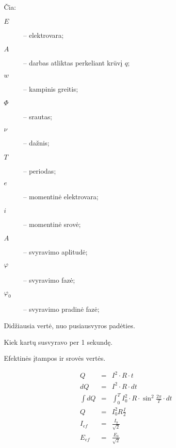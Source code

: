 Čia:
\begin{description}
  \item[$E$] – elektrovara;
  \item[$A$] – darbas atliktas perkeliant krūvį $q$;
  \item[$w$] – kampinis greitis;
  \item[$\Phi$] – srautas; %
  \item[$\nu$] – dažnis;
  \item[$T$] – periodas;
  \item[$e$] – momentinė elektrovara;
  \item[$i$] – momentinė srovė;
  \item[$A$] – svyravimo aplitudė;
  \item[$\varphi$] – svyravimo fazė;
  \item[$\varphi_{0}$] – svyravimo pradinė fazė;
\end{description}

\begin{defn}[Aplitudė]
  Didžiausia vertė, nuo pusiausvyros padėties.
\end{defn}

\begin{defn}
  Kiek kartų susvyravo per 1 sekundę.
\end{defn}

Efektinės įtampos ir srovės vertės.

\begin{align*}
  Q &=& I^{2} \cdot R \cdot t \\
  dQ &=& I^{2} \cdot R \cdot dt \\
  \int dQ &=&
    \int _{0} ^{T} I_{0}^{2} \cdot R 
    \cdot \sin^{2} \frac{2 \pi}{T} \cdot dt \\
  Q &=&  I^{2}_{0} R \frac{I}{2} \\
  I_{ef} &=&  \frac{I_{0}}{\sqrt{2}} \\
  E_{ef} &=&  \frac{E_{0}}{\sqrt{2}}
\end{align*}

